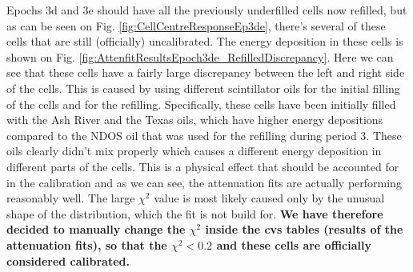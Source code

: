 Epochs 3d and 3e should have all the previously underfilled cells now refilled, but as can be seen on Fig. \ref{fig:CellCentreResponseEp3de}, there's several of these cells that are still (officially) uncalibrated. The energy deposition in these cells is shown on Fig. \ref{fig:AttenfitResultsEpoch3de_RefilledDiscrepancy}. Here we can see that these cells have a fairly large discrepancy between the left and right side of the cells. This is caused by using different scintillator oils for the initial filling of the cells and for the refilling. Specifically, these cells have been initially filled with the Ash River and the Texas oils, which have higher energy depositions compared to the NDOS oil that was used for the refilling during period 3. These oils clearly didn't mix properly which causes a different energy deposition in different parts of the cells. This is a physical effect that should be accounted for in the calibration and as we can see, the attenuation fits are actually performing reasonably well. The large $\chi^2$ value is most likely caused only by the unusual shape of the distribution, which the fit is not build for. \textbf{We have therefore decided to manually change the $\chi^2$ inside the cvs tables (results of the attenuation fits), so that the $\chi^2<0.2$ and these cells are officially considered calibrated.}

